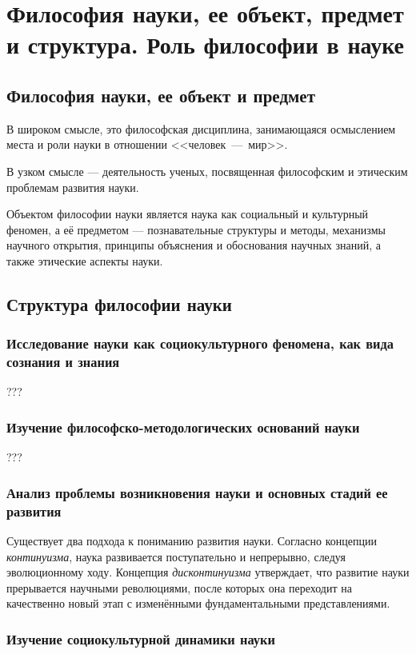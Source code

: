 \section{Философия науки, ее объект, предмет и структура. Роль философии в науке }   

\subsection{Философия науки, ее объект и предмет}

В широком смысле, это философская дисциплина, занимающаяся осмыслением места и роли науки в отношении <<человек~—~мир>>.

В узком смысле — деятельность ученых, посвященная философским и этическим проблемам развития науки.

Объектом философии науки является наука как социальный и культурный феномен, а её предметом — познавательные структуры и методы, механизмы научного открытия, принципы объяснения и обоснования научных знаний, а также этические аспекты науки.

\subsection{Структура философии науки}

\subsubsection{Исследование науки как социокультурного феномена, как вида сознания и знания}
???
\subsubsection{Изучение философско-методологических оснований науки}
???
\subsubsection{Анализ проблемы возникновения науки и основных стадий ее развития
}
Существует два подхода к пониманию развития науки. Согласно концепции \textit{континуизма}, наука развивается поступательно и непрерывно, следуя эволюционному ходу. Концепция \textit{дисконтинуизма} утверждает, что развитие науки прерывается научными революциями, после которых она переходит на качественно новый этап с изменёнными фундаментальными представлениями.
    
\subsubsection{Изучение социокультурной динамики науки}

